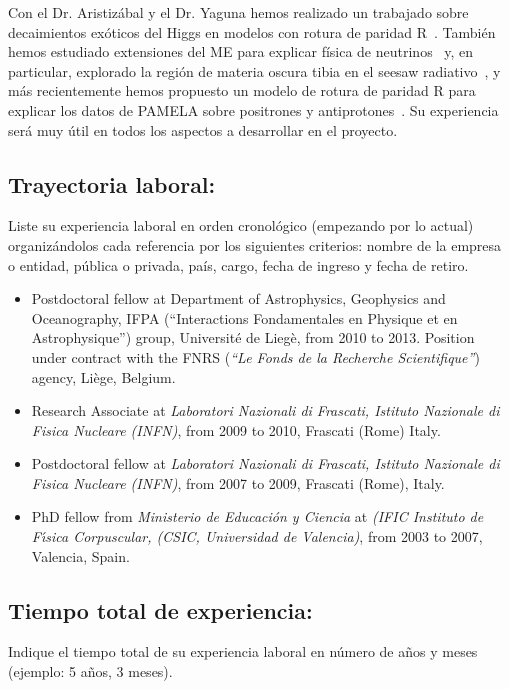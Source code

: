 Con el Dr. Aristizábal y el Dr. Yaguna hemos realizado un trabajado
sobre decaimientos exóticos del Higgs en modelos con rotura de paridad
R~\cite{AristizabalSierra:2008ye}. También hemos estudiado extensiones
del ME para explicar física de
neutrinos~\cite{Sierra:2008wj,AristizabalSierra:2006ri} y, en
particular, explorado la región de materia oscura tibia en el seesaw
radiativo~\cite{Sierra:2008wj}, y más recientemente hemos propuesto un
modelo de rotura de paridad R para explicar los datos de PAMELA sobre
positrones y antiprotones~\cite{Sierra:2009zq}.  Su experiencia será
muy útil en todos los aspectos a desarrollar en el proyecto.
\subsection{Trayectoria laboral:}
\begin{instrucciones}
  Liste su experiencia laboral en orden cronológico (empezando por lo
  actual) organizándolos cada referencia por los siguientes criterios:
  nombre de la empresa o entidad, pública o privada, país, cargo,
  fecha de ingreso y fecha de retiro.
\end{instrucciones}
\begin{itemize}
\item Postdoctoral fellow at Department of Astrophysics, Geophysics
  and Oceanography, IFPA (``Interactions Fondamentales en Physique et
  en Astrophysique'') group, Universit\'e de Lieg\`e, from 2010 to
  2013. Position under contract with the FNRS ({\it ``Le Fonds de la
    Recherche Scientifique''}) agency, Liège, Belgium.
\item Research Associate at {\it Laboratori Nazionali di
    Frascati, Istituto Nazionale di Fisica Nucleare (INFN)}, from
  2009 to 2010, Frascati (Rome) Italy.
\item Postdoctoral fellow at {\it Laboratori Nazionali di Frascati,
    Istituto Nazionale di Fisica Nucleare (INFN)}, from 2007 to 2009,
  Frascati (Rome), Italy.
\item PhD fellow from {{\it Ministerio de Educaci\'on y Ciencia}} at
  {\it (IFIC Instituto de F\'{\i}sica Corpuscular, (CSIC, Universidad
    de Valencia)}, from 2003 to 2007, Valencia, Spain.
\end{itemize}
\subsection{Tiempo total de experiencia:}
\begin{instrucciones}
  Indique el tiempo total de su experiencia laboral en número de años
  y meses (ejemplo: 5 años, 3 meses).
\end{instrucciones}


